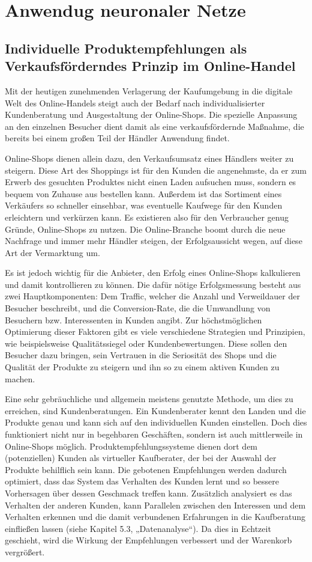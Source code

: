 \documentclass[twoside,a4paper,draft]{article}
\begin{document}
\section{Anwendug neuronaler Netze}

\subsection{Individuelle Produktempfehlungen als Verkaufsförderndes Prinzip im Online-Handel}

Mit der heutigen zunehmenden Verlagerung der Kaufumgebung in die digitale Welt des Online-Handels steigt auch der Bedarf nach individualisierter Kundenberatung und Ausgestaltung der Online-Shops. Die spezielle Anpassung an den einzelnen Besucher dient damit als eine verkaufsfördernde Maßnahme, die bereits bei einem großen Teil der Händler Anwendung findet.

Online-Shops dienen allein dazu, den Verkaufsumsatz eines Händlers weiter zu steigern. Diese Art des Shoppings ist für den Kunden die angenehmste, da er zum Erwerb des gesuchten Produktes nicht einen Laden aufsuchen muss, sondern es bequem von Zuhause aus bestellen kann. Außerdem ist das Sortiment eines Verkäufers so schneller einsehbar, was eventuelle Kaufwege für den Kunden erleichtern und verkürzen kann. Es existieren also für den Verbraucher genug Gründe, Online-Shops zu nutzen. Die Online-Branche boomt durch die neue Nachfrage und immer mehr Händler steigen, der Erfolgsaussicht wegen, auf diese Art der Vermarktung um.

Es ist jedoch wichtig für die Anbieter, den Erfolg eines Online-Shops kalkulieren und damit kontrollieren zu können. Die dafür nötige Erfolgsmessung besteht aus zwei Hauptkomponenten: Dem Traffic, welcher die Anzahl und Verweildauer der Besucher beschreibt, und die Conversion-Rate, die die Umwandlung von Besuchern bzw. Interessenten in Kunden angibt. Zur höchstmöglichen Optimierung dieser Faktoren gibt es viele verschiedene Strategien und Prinzipien, wie beispielsweise Qualitätssiegel oder Kundenbewertungen. Diese sollen den Besucher dazu bringen, sein Vertrauen in die Seriosität des Shops und die Qualität der Produkte zu steigern und ihn so zu einem aktiven Kunden zu machen.

Eine sehr gebräuchliche und allgemein meistens genutzte Methode, um dies zu erreichen, sind Kundenberatungen. Ein Kundenberater kennt den Landen und die Produkte genau und kann sich auf den individuellen Kunden einstellen. Doch dies funktioniert nicht nur in begehbaren Geschäften, sondern ist auch mittlerweile in Online-Shops möglich. Produktempfehlungssysteme dienen dort dem (potenziellen) Kunden als virtueller Kaufberater, der bei der Auswahl der Produkte behilflich sein kann. Die gebotenen Empfehlungen werden dadurch optimiert, dass das System das Verhalten des Kunden lernt und so bessere Vorhersagen über dessen Geschmack treffen kann. Zusätzlich analysiert es das Verhalten der anderen Kunden,  kann Parallelen zwischen den Interessen und dem Verhalten erkennen und die damit verbundenen Erfahrungen in die Kaufberatung einfließen lassen (siehe Kapitel 5.3, „Datenanalyse“). Da dies in Echtzeit geschieht, wird die Wirkung der Empfehlungen verbessert und der Warenkorb vergrößert.
\end{document}
